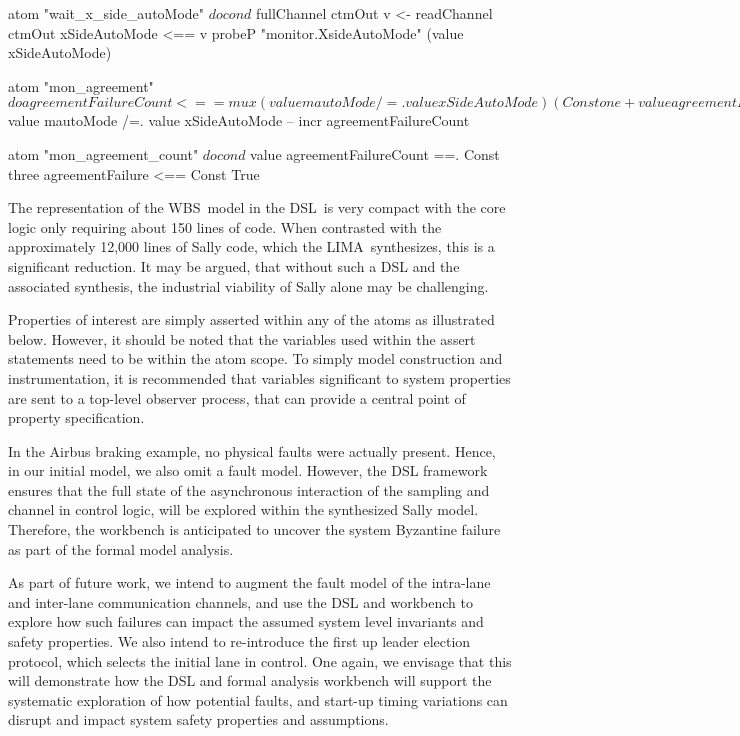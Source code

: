 \begin{lima}
atom "wait_x_side_autoMode" $ do
      cond $ fullChannel ctmOut
      v <- readChannel ctmOut
      xSideAutoMode <== v
      probeP "monitor.XsideAutoMode" (value xSideAutoMode)

 atom "mon_agreement" $ do
      agreementFailureCount <==
        mux (value mautoMode /=. value xSideAutoMode)
            (Const one + value agreementFailureCount)
            (Const zero)
      -- cond $ value mautoMode /=. value xSideAutoMode
      -- incr agreementFailureCount

    atom "mon_agreement_count" $ do
      cond $ value agreementFailureCount ==. Const three
      agreementFailure <== Const True

\end{lima}

The representation of the WBS\ model in the DSL\ is very compact with the core logic only requiring about 150 lines of code.
 When contrasted with the approximately 12,000
lines of Sally code, which the LIMA\ synthesizes,  this is a significant reduction. It may be argued, that without such a DSL and the associated synthesis, the industrial viability of Sally alone may be challenging.

  
 Properties of interest  are simply asserted within any of the atoms as illustrated below. However, it should be noted that the variables used within the assert statements need to be within the atom scope.
 To simply model construction and instrumentation, it is recommended that variables significant to system properties are sent to a top-level observer process, that can provide a central point of property specification.  



In the Airbus braking example, no physical faults were actually present. Hence, in our initial model, we also omit a  fault model. However, the DSL framework ensures that the full state of the asynchronous interaction of the sampling and channel in control logic, will be explored within the synthesized  Sally model. Therefore, the workbench is anticipated to uncover the system Byzantine failure as part of the formal model analysis.

As part of future work, we intend to augment the fault model of the
intra-lane and inter-lane communication channels, and use the
DSL and workbench to explore how such failures can impact the assumed
system level invariants and safety properties. We also intend to
re-introduce the first up leader election protocol, which selects the
initial lane in control. One again, we envisage that this will
demonstrate how the DSL and formal analysis workbench will support
the systematic exploration of how potential faults, and start-up
timing variations can disrupt and impact system safety properties and
assumptions.

